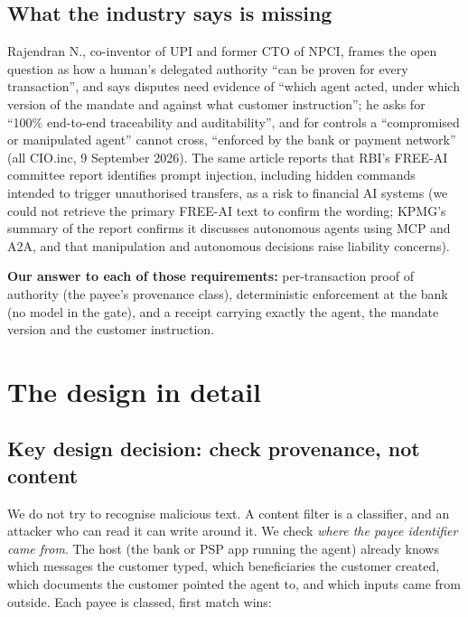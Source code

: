 \documentclass[10pt,a4paper]{article}
\begin{document}
\subsection{What the industry says is missing}
Rajendran N., co-inventor of UPI and former CTO of NPCI, frames the open question as how a human's delegated authority
``can be proven for every transaction'', and says disputes need evidence of ``which agent acted, under which version of the
mandate and against what customer instruction''; he asks for ``100\% end-to-end traceability and auditability'', and for
controls a ``compromised or manipulated agent'' cannot cross, ``enforced by the bank or payment network'' (all CIO.inc,
9 September 2026). The same article reports that RBI's FREE-AI committee report identifies prompt injection, including
hidden commands intended to trigger unauthorised transfers, as a risk to financial AI systems (we could not retrieve the
primary FREE-AI text to confirm the wording; KPMG's summary of the report confirms it discusses autonomous agents using MCP
and A2A, and that manipulation and autonomous decisions raise liability concerns).

\textbf{Our answer to each of those requirements:} per-transaction proof of authority (the payee's provenance class),
deterministic enforcement at the bank (no model in the gate), and a receipt carrying exactly the agent, the mandate version
and the customer instruction.

\section{The design in detail}

\subsection{Key design decision: check provenance, not content}
We do not try to recognise malicious text. A content filter is a classifier, and an attacker who can read it can write around
it. We check \emph{where the payee identifier came from}. The host (the bank or PSP app running the agent) already knows which
messages the customer typed, which beneficiaries the customer created, which documents the customer pointed the agent to,
and which inputs came from outside. Each payee is classed, first match wins:
\end{document}
